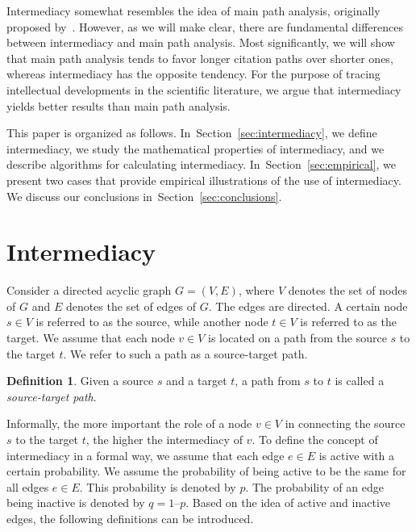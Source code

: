 \documentclass{article}
\theoremstyle{definition}
\newtheorem{definition}{Definition}
\newcommand{\secref}[1]{Section~\ref{sec:#1}\xspace}
\begin{document}
Intermediacy somewhat resembles the idea of main path analysis, originally proposed by~\citet{Hummon1989}. However, as we will make clear, there are fundamental differences between intermediacy and main path analysis. Most significantly, we will show that main path analysis tends to favor longer citation paths over shorter ones, whereas intermediacy has the opposite tendency. For the purpose of tracing intellectual developments in the scientific literature, we argue that intermediacy yields better results than main path analysis.

This paper is organized as follows. In~\secref{intermediacy}, we define intermediacy, we study the mathematical properties of intermediacy, and we describe algorithms for calculating intermediacy. In~\secref{empirical}, we present two cases that provide empirical illustrations of the use of intermediacy. We discuss our conclusions in~\secref{conclusions}.

%
%

\section{\label{sec:intermediacy}Intermediacy}

Consider a directed acyclic graph $G = (V, E)$, where $V$ denotes the set of nodes of $G$ and $E$ denotes the set of edges of $G$. The edges are directed. A certain node $s \in V$ is referred to as the source, while another node $t \in V$ is referred to as the target. We assume that each node $v \in V$ is located on a path from the source $s$ to the target $t$. We refer to such a path as a source-target path.

\begin{definition}
	Given a source $s$ and a target $t$, a path from $s$ to $t$ is called a \emph{source-target path}.
\end{definition}

Informally, the more important the role of a node $v \in V$ in connecting the source $s$ to the target $t$, the higher the intermediacy of $v$. To define the concept of intermediacy in a formal way, we assume that each edge $e \in E$ is active with a certain probability. We assume the probability of being active to be the same for all edges $e \in E$. This probability is denoted by $p$. The probability of an edge being inactive is denoted by $q = 1 – p$. Based on the idea of active and inactive edges, the following definitions can be introduced.
\end{document}
